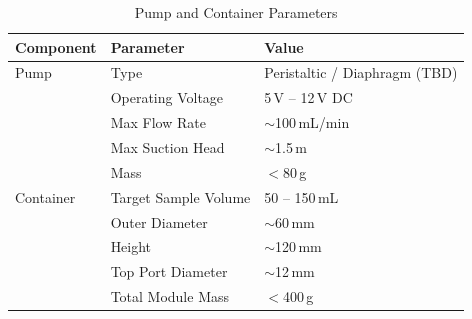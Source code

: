 \begin{table}[H]
    \centering
    \caption{Pump and Container Parameters}
    \begin{tabular}{lll}
        \toprule
        \textbf{Component} & \textbf{Parameter} & \textbf{Value} \\
        \midrule
        Pump & Type & Peristaltic / Diaphragm (TBD) \\
             & Operating Voltage & 5\,V -- 12\,V DC \\
             & Max Flow Rate & $\sim$100\,mL/min \\
             & Max Suction Head & $\sim$1.5\,m \\
             & Mass & $<$80\,g \\
        \midrule
        Container & Target Sample Volume & 50 -- 150\,mL \\
                  & Outer Diameter & $\sim$60\,mm \\
                  & Height & $\sim$120\,mm \\
                  & Top Port Diameter & $\sim$12\,mm \\
                  & Total Module Mass & $<$400\,g \\
        \bottomrule
    \end{tabular}
    \label{tab:sampling_params}
\end{table}